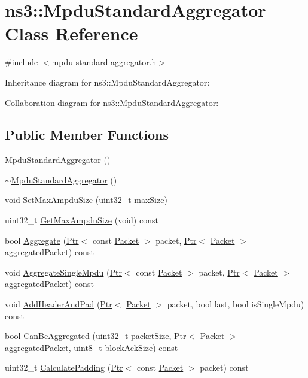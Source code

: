 \hypertarget{classns3_1_1MpduStandardAggregator}{}\section{ns3\+:\+:Mpdu\+Standard\+Aggregator Class Reference}
\label{classns3_1_1MpduStandardAggregator}


{\ttfamily \#include $<$mpdu-\/standard-\/aggregator.\+h$>$}



Inheritance diagram for ns3\+:\+:Mpdu\+Standard\+Aggregator\+:


Collaboration diagram for ns3\+:\+:Mpdu\+Standard\+Aggregator\+:
\subsection*{Public Member Functions}
\begin{DoxyCompactItemize}
\item 
\hyperlink{classns3_1_1MpduStandardAggregator_a01d1669f60722abe9a34cbfd24aff973}{Mpdu\+Standard\+Aggregator} ()
\item 
\hyperlink{classns3_1_1MpduStandardAggregator_ae5bd109aef4b4c3d2e903a9cef9fd4d0}{$\sim$\+Mpdu\+Standard\+Aggregator} ()
\item 
void \hyperlink{classns3_1_1MpduStandardAggregator_aa180c7dbeca04fa473f79e6ca107584d}{Set\+Max\+Ampdu\+Size} (uint32\+\_\+t max\+Size)
\item 
uint32\+\_\+t \hyperlink{classns3_1_1MpduStandardAggregator_adea8b7a94c26a41f893297f59978e4b7}{Get\+Max\+Ampdu\+Size} (void) const 
\item 
bool \hyperlink{classns3_1_1MpduStandardAggregator_ae8df5366479ace23f603e772a32721dc}{Aggregate} (\hyperlink{classns3_1_1Ptr}{Ptr}$<$ const \hyperlink{classns3_1_1Packet}{Packet} $>$ packet, \hyperlink{classns3_1_1Ptr}{Ptr}$<$ \hyperlink{classns3_1_1Packet}{Packet} $>$ aggregated\+Packet) const 
\item 
void \hyperlink{classns3_1_1MpduStandardAggregator_a8ae46f2c643b8b39b31c28875db10372}{Aggregate\+Single\+Mpdu} (\hyperlink{classns3_1_1Ptr}{Ptr}$<$ const \hyperlink{classns3_1_1Packet}{Packet} $>$ packet, \hyperlink{classns3_1_1Ptr}{Ptr}$<$ \hyperlink{classns3_1_1Packet}{Packet} $>$ aggregated\+Packet) const 
\item 
void \hyperlink{classns3_1_1MpduStandardAggregator_a20f9b233d444b85d4ed22b622dbc3bcd}{Add\+Header\+And\+Pad} (\hyperlink{classns3_1_1Ptr}{Ptr}$<$ \hyperlink{classns3_1_1Packet}{Packet} $>$ packet, bool last, bool is\+Single\+Mpdu) const 
\item 
bool \hyperlink{classns3_1_1MpduStandardAggregator_afe782faf74fce1ae60b4e59182eea462}{Can\+Be\+Aggregated} (uint32\+\_\+t packet\+Size, \hyperlink{classns3_1_1Ptr}{Ptr}$<$ \hyperlink{classns3_1_1Packet}{Packet} $>$ aggregated\+Packet, uint8\+\_\+t block\+Ack\+Size) const 
\item 
uint32\+\_\+t \hyperlink{classns3_1_1MpduStandardAggregator_af00b3fee23a51d256dc0c2df6f488a93}{Calculate\+Padding} (\hyperlink{classns3_1_1Ptr}{Ptr}$<$ const \hyperlink{classns3_1_1Packet}{Packet} $>$ packet) const 
\end{DoxyCompactItemize}
